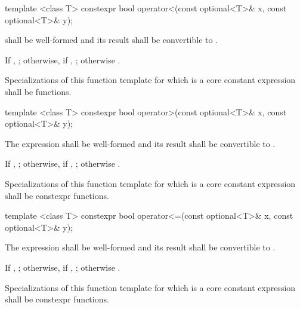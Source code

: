 %
\begin{itemdecl}
template <class T> constexpr bool operator<(const optional<T>& x, const optional<T>& y);
\end{itemdecl}

\begin{itemdescr}
\pnum
\requires
{} shall be well-formed
and its result shall be convertible to .

\pnum
\returns
If , ;
otherwise, if , ;
otherwise .

\pnum
\remarks
Specializations of this function template
for which  is a core constant expression
shall be  functions.
\end{itemdescr}

%
\begin{itemdecl}
template <class T> constexpr bool operator>(const optional<T>& x, const optional<T>& y);
\end{itemdecl}

\begin{itemdescr}
\pnum
\requires
The expression  shall be well-formed and
its result shall be convertible to .

\pnum
\returns
If , ;
otherwise, if , ;
otherwise .

\pnum
\remarks
Specializations of this function template
for which  is a core constant expression
shall be constexpr functions.
\end{itemdescr}

%
\begin{itemdecl}
template <class T> constexpr bool operator<=(const optional<T>& x, const optional<T>& y);
\end{itemdecl}

\begin{itemdescr}
\pnum
\requires
The expression  shall be well-formed and
its result shall be convertible to .

\pnum
\returns
If , ;
otherwise, if , ;
otherwise .

\pnum
\remarks
Specializations of this function template
for which  is a core constant expression
shall be constexpr functions.
\end{itemdescr}

